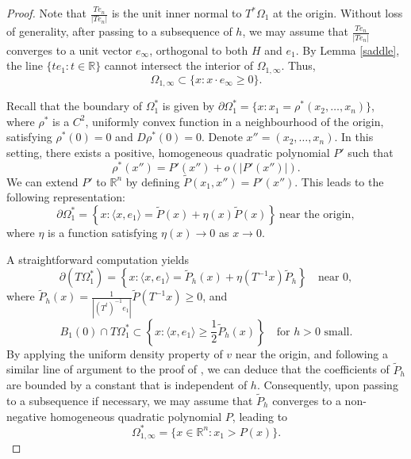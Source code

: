 \documentclass[11pt]{amsart}
\theoremstyle{plain}
\newcommand{\R}{\mathbb{R}}
\newcommand{\0}{\textbf{0}}
\numberwithin{equation}{section}
\numberwithin{equation}{section}
\numberwithin{figure}{section}
\begin{document}
\begin{proof}
 Note that \(\frac{Te_n}{|Te_n|}\) is the unit inner normal to \(T^*\Omega_1\) at the origin. Without loss of generality, after passing to a subsequence of \(h\), we may assume that \(\frac{Te_n}{|Te_n|}\) converges to a unit vector \(e_\infty\), orthogonal to both \(H\) and \(e_1\). By Lemma \ref{saddle}, the line \(\{te_1 : t \in \mathbb{R}\}\) cannot intersect the interior of \(\Omega_{1, \infty}\). Thus,
\begin{equation}\label{gp22}
\Omega_{1, \infty} \subset \{x : x \cdot e_\infty \geq 0\}.
\end{equation}




Recall that the boundary of $\Omega^*_1$ is given by \(\partial \Omega^*_1 = \{x : x_1 = \rho^*(x_2, \ldots, x_n)\}\), where \(\rho^*\) is a \(C^2\), uniformly convex function in a neighbourhood of the origin, satisfying \(\rho^*(0) = 0\) and \(D\rho^*(0) = 0\). Denote \(x'' = (x_2, \ldots, x_n)\). In this setting, there exists a positive, homogeneous quadratic polynomial \(P'\) such that
\[\rho^*(x'') = P'(x'') + o(|P'(x'')|).\]
We can extend \(P'\) to \(\R^n\) by defining \(\tilde{P}(x_1, x'') = P'(x'')\). This leads to the following representation:
\[\partial \Omega^*_1 = \left\{x : \langle x, e_1\rangle= \tilde{P}(x) + \eta(x)\tilde{P}(x)\right\}\ \text{near the origin},\]
where $\eta$ is a function satisfying $\eta(x)\rightarrow 0$ as $x\rightarrow 0.$

A straightforward computation yields
\begin{equation}\label{h10}
\partial (T\Omega_1^*) = \left\{x : \langle x, e_1\rangle = \tilde{P}_h(x) + \eta(T^{-1}x)\tilde{P}_h\right\} \quad \text{near } 0,
\end{equation}
where \(\tilde{P}_h(x) = \frac{1}{|(T^t)^{-1}e_1|} \tilde{P}(T^{-1}x) \geq 0\), and
\begin{equation}\label{colla}
B_1(0) \cap T\Omega_1^* \subset \left\{x : \langle x, e_1\rangle \geq \frac{1}{2}\tilde{P}_h(x)\right\} \quad \text{for \(h > 0\) small}.
\end{equation}
By applying the uniform density property of \( v \) near the origin, and following a similar line of argument to the proof of \cite[Lemma 5.14]{CLW3}, we can deduce that the coefficients of \( \tilde{P}_h \) are bounded by a constant that is independent of \( h \).
 Consequently, upon passing to a subsequence if necessary, we may assume that \(\tilde{P}_h\) converges to a non-negative homogeneous quadratic polynomial \(P\), leading to
\begin{equation}\label{gp111}
\Omega_{1,\infty}^* = \{x \in \mathbb{R}^n : x_1 > P(x)\}.
\end{equation}



\end{proof}
\end{document}
